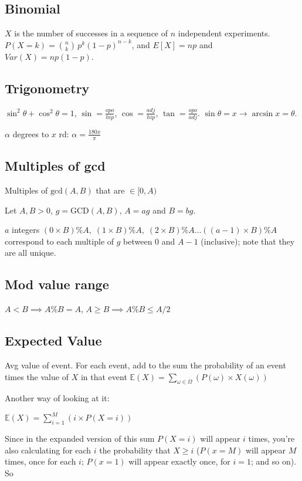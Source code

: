 \documentclass[a4paper]{article}
\begin{document}
\subsection{Binomial}
$X$ is the number of successes in a sequence of $n$ independent experiments.  $P(X = k) = \binom{n}{k}\,p^{k}(1-p)^{n-k}$, and $E[X] = np$ and $Var(X) = np(1-p)$.

\subsection{Trigonometry}
$\sin^2\theta + \cos^2\theta = 1$, $\sin = \frac{opo}{hip}$, $\cos = \frac{adj}{hip}$, $\tan = \frac{opo}{adj}$. $\sin \theta = x \to \arcsin x = \theta$.

$\alpha$ degrees to $x$ rd: $\alpha = \frac{180x}{\pi}$

\subsection{Multiples of gcd}
Multiples of $\textrm{gcd}(A, B)$ that are $\in [0, A)$

Let $A, B > 0$, $g = \textrm{GCD}(A, B)$, $A = ag$ and $B = bg$.

$a$ integers
$(0\times B) \% A,\; (1\times B) \% A,\; (2\times B) \% A \dotsc ((a-1)\times B) \% A$
correspond to each multiple of $g$ between $0$ and $A-1$ (inclusive); note that they
are all unique.

\subsection{Mod value range}
$A < B \implies A\%B=A$, $A \geq B \implies A\%B \leq A/2$

\subsection{Expected Value}
Avg value of event. For each event, add to the sum the probability of an event times the value of $X$ in that event
$\mathbb{E}(X) = \sum_{\omega \in \Omega} (P(\omega)\times X(\omega))$

Another way of looking at it:

$\mathbb{E}(X) = \sum_{i=1}^{M} (i \times P(X=i))$

Since in the expanded version of this sum $P(X=i)$ will appear $i$ times, you're also calculating for each $i$ the probability that $X \geq i$ ($P(x=M)$ will appear $M$ times, once for each $i$; $P(x=1)$ will appear exactly once, for $i=1$; and so on). So
\end{document}
